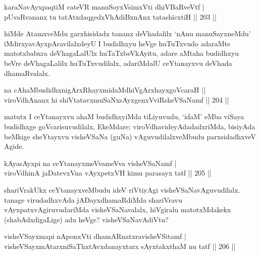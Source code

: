 \begin{shl}
karaNavAyxpaqtiM cateVR manuSoyxV\s simxVti dhiVBaRveVtf | \\
pUvaRvananx tu tatAtxdaqgedxVhAdiBxnAnx tatashicxtiH \hfill ||  203 || 
\end{shl}

\begin{artha}
hiMde AtamxveMdu garxhisidadx tananx deVhadalilx `nAnu manuSayxneMdu' iMdirxyavAyxpAravilalxdeyU I budidhxyu heVge huTuTxvudo adaraMte matotxbabxra deVhagaLalUlx huTaTxbeVkAyitu, adare aMtaha budidhxyu beVre deVhagaLalilx huTuTxvudilalx, adariMdalU ceYtanayxvu deVhada dhamaRvalalx.
\end{artha}


\begin{shl}
na cAhaMbudidhxnigArxRhayxmidaMdhiVgArxhayxgoVcaraH ||  \\
viroVdhAnanx hi shiVtatavxmuSaNxsAyxgenxVviRsheVSaNamf \hfill ||  204 ||  
\end{shl}

\begin{artha}
matutx I ceYtanayxvu ahaM budidhxyiMda tiLiyuvudu, `idaM' eMba viSaya budidhxge goVcarisuvudilalx, EkeMdare; viroVdhavideyAdadadxriMda, bisiyAda beMkige sheYtayxvu visheVSaNa (guNa) vAguvudilalxveMbudu parxsidadhxveV Agide.
\end{artha}

\begin{shl}
kAyasAyxpi na ceYtanayxmeVvameVva visheVSaNamf | \\
viroVdhinA jaDatevxVna vAyxpetxVH kimu parasayx tatf \hfill ||  205 ||  
\end{shl}

\begin{artha}
shariVrakUkx ceYtanayxveMbudu ideV riVtiyAgi visheVSaNavAguvudilalx. tanage virudadhxvAda jADayxdhamaRdiMda  shariVravu vAyxpatxvAgiruvudariMda visheVSaNavalalx, hiVgiralu matotxMdakekx (shabAdxdigaLige) adu heVge? visheVSaNavAdiVtu?
\end{artha}


\begin{shl}
visheVSayxmapi nA\s \s ponxVti dhamARnatxravisheVSitamf | \\
visheVSayxmAtarxniSaThxtAvxdanayxtarx sAyxtakxthaM nu tatf \hfill ||  206 ||  
\end{shl}

